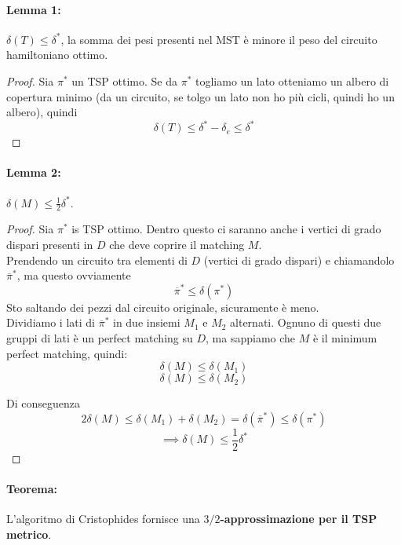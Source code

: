 \documentclass[11pt]{article}
\begin{document}
	\newpage
	
	\paragraph{Lemma 1:} $\delta (T) \leq \delta^\ast$, la somma dei pesi presenti nel MST è minore il peso del circuito hamiltoniano ottimo.\\
	
	\begin{proof}
		Sia $\pi^\ast$ un TSP ottimo. Se da $\pi^\ast$ togliamo un lato otteniamo un albero di copertura minimo (da un circuito, se tolgo un lato non ho più cicli, quindi ho un albero), quindi 
		$$ \delta (T) \leq \delta^\ast - \delta_e \leq \delta^\ast $$
	\end{proof}
	
	\paragraph{Lemma 2:} $\delta(M) \leq \frac{1}{2} \delta^\ast$.\\
	
	\begin{proof}
		Sia $\pi^\ast$ is TSP ottimo. Dentro questo ci saranno anche i vertici di grado dispari presenti in $D$ che deve coprire il matching $M$.\\
		
		Prendendo un circuito tra elementi di $D$ (vertici di grado dispari) e chiamandolo $\overline{\pi}^\ast$, ma questo ovviamente 
		$$\overline{\pi}^\ast \leq \delta (\pi^\ast) $$
		Sto saltando dei pezzi dal circuito originale, sicuramente è meno.\\
		
		Dividiamo i lati di $\overline{\pi}^\ast$ in due insiemi $M_1$ e $M_2$ alternati. Ognuno di questi due gruppi di lati è un perfect matching su $D$, ma sappiamo che $M$  è il minimum perfect matching, quindi:
		$$ \delta (M) \leq \delta (M_1) $$
		$$ \delta (M) \leq \delta (M_2) $$
		
		Di conseguenza
		$$ 2 \delta (M) \leq \delta (M_1) + \delta (M_2)  = \delta (\overline{\pi}^\ast) \leq \delta (\pi^\ast)$$
		$$ \implies \delta (M) \leq \frac{1}{2} \delta^\ast$$
	\end{proof}
	
	\paragraph{Teorema:} L'algoritmo di Cristophides fornisce una \textbf{$3/2$-approssimazione per il TSP metrico}.\\
	
\end{document}
